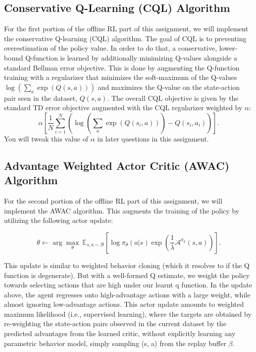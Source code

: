 \documentclass{article}
\begin{document}
\subsection{Conservative Q-Learning (CQL) Algorithm}
For the first portion of the offline RL part of this assignment, we will implement the conservative Q-learning (CQL) algorithm. The goal of CQL is to preventing overestimation of the policy value. In order to do that, a conservative, lower-bound Q-function is learned by additionally minimizing Q-values alongside a standard Bellman error objective. This is done by augmenting the Q-function training with a regularizer that minimizes the soft-maximum of the Q-values $\log \left( \sum_{a} \exp(Q(s, a)) \right)$ and maximizes the Q-value on the state-action pair seen in the dataset, $Q(s, a)$. The overall CQL objective is given by the standard TD error objective augmented with the CQL regularizer weighted by $\alpha$: 
\[\alpha \left[\frac{1}{N}\sum_{i=1}^N \left(\log\left(\sum_{a} \exp(Q(s_i, a))\right) - Q(s_i, a_i) \right) \right].\] 
You will tweak this value of $\alpha$ in later questions in this assignment.  

\subsection{Advantage Weighted Actor Critic (AWAC) Algorithm}
For the second portion of the offline RL part of this assignment, we will implement the AWAC algorithm. This augments the training of the policy by utilizing the following actor update:

\begin{equation}
    \theta \leftarrow \arg \max_\theta~ \mathbb{E}_{s, a \sim \mathcal{B}} \left[\log \pi_{\theta}(a|s) \exp\left(\frac{1}{\lambda} \mathcal{A}^{\pi_{k}}(s,a)\right) \right].
\end{equation}

This update is similar to weighted behavior cloning (which it resolves to if the Q function is degenerate). But with a well-formed Q estimate, we weight the policy towards selecting actions that are high under our learnt q function. In the update above, the agent regresses onto high-advantage actions with a large weight, while almost ignoring low-advantage actions. This actor update amounts to weighted maximum likelihood (i.e., supervised learning), where the targets are obtained by re-weighting the state-action pairs observed in the current dataset
by the predicted advantages from the learned critic, without
explicitly learning any parametric behavior model, simply
sampling (s, a) from the replay buffer $\beta$. 
\end{document}
